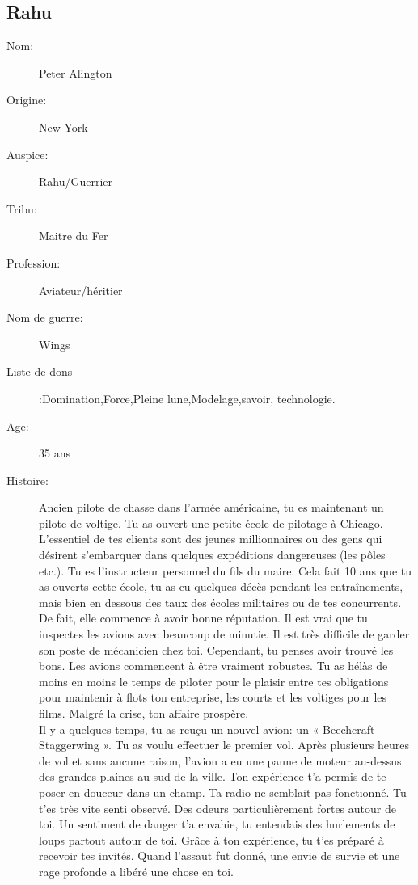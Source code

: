 \documentclass[oneside,12pt]{book}
\begin{document}
\begin{flushleft}
\section{Rahu}
\begin{description}
\item[Nom:]{Peter Alington}
\item[Origine:]{New York}
\item[Auspice:]{Rahu/Guerrier}
\item[Tribu:]{Maitre du Fer}
\item[Profession:]{Aviateur/héritier}
\item[Nom de guerre:]{Wings}
\item[Liste de dons]:Domination,Force,Pleine lune,Modelage,savoir, technologie.
\item[Age:]{35 ans}
\item[Histoire:]{
Ancien pilote de chasse dans l'armée américaine, tu es maintenant un pilote de voltige. Tu as ouvert une petite école de pilotage à Chicago. 
L'essentiel de tes clients sont des jeunes millionnaires ou des gens qui désirent s'embarquer dans quelques expéditions dangereuses (les pôles etc.). 
Tu es l'instructeur personnel du fils du maire. 
Cela fait 10 ans que tu as ouverts cette école, tu as eu quelques décès pendant les entraînements, mais bien en dessous des taux des écoles militaires ou de tes concurrents. De fait, elle commence à avoir bonne réputation.
Il est vrai que tu inspectes les avions avec beaucoup de minutie. Il est très difficile de garder son poste de mécanicien chez toi. 
Cependant, tu penses avoir trouvé les bons. Les avions commencent à être vraiment robustes. Tu as hélàs de moins en moins le temps de piloter pour le plaisir
entre tes obligations pour maintenir à flots ton entreprise, les courts et les voltiges pour les films. Malgré la crise, ton affaire prospère. 
\\
Il y a quelques temps, tu as reuçu un nouvel avion: un « Beechcraft Staggerwing ».
Tu as voulu effectuer le premier vol. 
Après plusieurs heures de vol et sans aucune raison, l'avion a eu une panne de moteur au-dessus des grandes plaines au sud de la ville.
Ton expérience t'a permis de te poser en douceur dans un champ. Ta radio ne semblait pas fonctionné. 
	Tu t'es très vite senti observé. Des odeurs particulièrement fortes autour de toi.
Un sentiment de danger t'a envahie, tu entendais des hurlements de loups partout autour de toi. Grâce à ton expérience, tu t'es préparé  à recevoir tes invités. 
Quand l'assaut fut donné, une envie de survie et une rage profonde a libéré une chose en toi. 
}
\end{description}
\end{flushleft}
\end{document}
